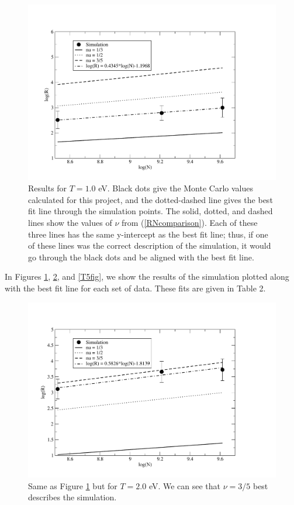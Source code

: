 \documentclass{article}
\begin{document}
\begin{multicols}{2}
\begin{figure}[H]
\begin{center}
\includegraphics[width=\linewidth]{Figures/T1plot.pdf}
\caption{Results for $T=1.0$ eV.  Black dots give the Monte Carlo values calculated for this project, and the dotted-dashed line gives the best fit line through the simulation points.  The solid, dotted, and dashed lines show the values of $\nu$ from (\ref{RNcomparison}).  Each of these three lines has the same y-intercept as the best fit line; thus, if one of these lines was the correct description of the simulation, it would go through the black dots and be aligned with the best fit line.}
\label{T1fig}
\end{center}
\end{figure}

In Figures \ref{T1fig}, \ref{T2fig}, and \ref{T5fig}, we show the results of the simulation plotted along with the best fit line for each set of data.  These fits are given in Table 2.  \\

\begin{figure}[H]
\begin{center}
\includegraphics[width=\linewidth]{Figures/T2plot.pdf}
\caption{Same as Figure \ref{T1fig} but for $T=2.0$ eV.  We can see that $\nu = 3/5$ best describes the simulation.}
\label{T2fig}
\end{center}
\end{figure}


\end{multicols}
\end{document}

